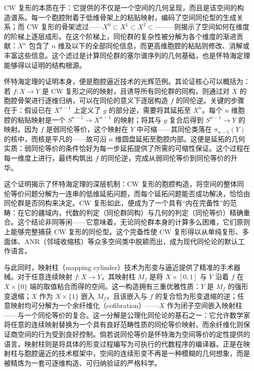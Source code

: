 \documentclass[12pt,a4paper]{article}
\begin{document}
CW 复形的本质在于：它提供的不仅是一个空间的几何呈现，而且是该空间的构造谱系。每一个胞腔附着于低维骨架上的粘贴映射，编码了空间同伦型的生成关系；而 CW 复形的骨架滤过——$X^0\subset X^1\subset X^2\subset\cdots$——则揭示了空间如何在维度的阶梯上逐层成形。在这个阶梯上，同伦群的复杂性被分解为各个维度的渐进贡献：$X^{n}$ 包含了 $n$ 维及以下的全部同伦信息，而更高维胞腔的粘贴则修改、消解或丰富这些信息。这个滤过是计算同伦群的塞尔谱序列的几何基础，也是怀特海定理能够得以证明的结构根源。

怀特海定理的证明本身，便是胞腔逼近技术的光辉范例。其论证核心可以概括为：若 $f:X\to Y$ 是 CW 复形之间的映射，且诱导所有同伦群的同构，则通过对 $X$ 的胞腔骨架进行逐维归纳，可以在同伦的意义下逐层构造 $f$ 的同伦逆。关键的步骤在于：假设已在 $X^{n-1}$ 上定义了 $g$ 的部分逆，需要将其延拓至 $X^n$。每个 $n$ 维胞腔的粘贴映射是一个 $S^{n-1}\to X^{n-1}$ 的映射；将其与 $g$ 复合后得到 $S^{n-1}\to Y$ 的映射。因为 $f$ 是弱同伦等价，这个映射在 $Y$ 中可缩——其同伦类落在 $\pi_{n-1}(Y)$ 的核中，而核是平凡的——故可沿 $n$ 维圆盘延拓至胞腔内部。这便是延拓的几何实质：弱同伦等价的条件恰好为每一步延拓提供了所需的可缩性保证。这个过程在每一维度上进行，最终构筑出 $f$ 的同伦逆，完成从弱同伦等价到同伦等价的升华。

这个证明揭示了怀特海定理的深层机制：CW 复形的胞腔构造，将空间的整体同伦等价问题分解为一连串的低维延拓问题，而每个延拓问题能否成功解决，恰恰由同伦群是否同构来决定。CW 复形如此，便成为了一个具有“内在完备性”的范畴：在它的疆域内，代数的判定（同伦群同构）与几何的判定（同伦等价）精确重合。这个结论非同等闲——它意味着，无论同伦群本身的计算多么困难，它们原则上能够完整捕获 CW 复形的同伦型。这个完备性使 CW 复形得以从单纯复形、多面体、ANR（邻域收缩核）等众多空间类中脱颖而出，成为现代同伦论的默认工作语言。

与此同时，映射柱（mapping cylinder）技术为形变与逼近提供了精准的手术器械。对于任意连续映射 $f:X\to Y$，其映射柱 $M_f$ 是将 $X\times [0,1]$ 与 $Y$ 沿着 $f$ 在 $X\times\{0\}$ 端的取值粘合而得的空间。这一构造拥有三重优雅性质：$Y$ 是 $M_f$ 的强形变退缩；$X$ 作为 $X\times\{1\}$ 嵌入 $M_f$，且该嵌入与 $f$ 的复合恰为形变退缩的逆；任意映射均可分解为一个余纤维化（cofibration）——$X$ 作为闭子空间嵌入映射柱——与一个同伦等价的复合。这一分解是公理化同伦论的基石之一：它允许数学家将任意的连续映射替换为一个具有良好范畴性质的同伦等价映射，而余纤维化则保证商空间的行为受到良好控制。倘若说同伦等价是怀特海为空间等价的定性提供的语言，映射柱则是将具体的形变过程编写为可执行的代数程序的编译器。正是在映射柱与胞腔逼近的技术框架中，空间的连续形变不再是一种模糊的几何想象，而是被精炼为一套可逐维构造、可归纳验证的严格科学。
\end{document}
